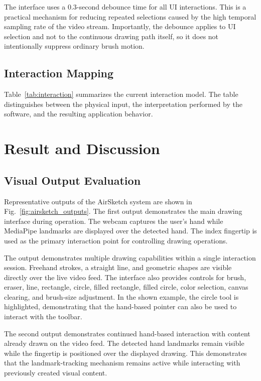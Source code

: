 \documentclass[conference]{IEEEtran}
\begin{document}
The interface uses a 0.3-second debounce time for all UI interactions. This is a practical mechanism for reducing repeated selections caused by the high temporal sampling rate of the video stream. Importantly, the debounce applies to UI selection and not to the continuous drawing path itself, so it does not intentionally suppress ordinary brush motion.

\subsection{Interaction Mapping}
Table~\ref{tab:interaction} summarizes the current interaction model. The table distinguishes between the physical input, the interpretation performed by the software, and the resulting application behavior.

\section{Result and Discussion}

\subsection{Visual Output Evaluation}

Representative outputs of the AirSketch system are shown in Fig.~\ref{fig:airsketch_outputs}. The first output demonstrates the main drawing interface during operation. The webcam captures the user's hand while MediaPipe landmarks are displayed over the detected hand. The index fingertip is used as the primary interaction point for controlling drawing operations.

The output demonstrates multiple drawing capabilities within a single interaction session. Freehand strokes, a straight line, and geometric shapes are visible directly over the live video feed. The interface also provides controls for brush, eraser, line, rectangle, circle, filled rectangle, filled circle, color selection, canvas clearing, and brush-size adjustment. In the shown example, the circle tool is highlighted, demonstrating that the hand-based pointer can also be used to interact with the toolbar.

The second output demonstrates continued hand-based interaction with content already drawn on the video feed. The detected hand landmarks remain visible while the fingertip is positioned over the displayed drawing. This demonstrates that the landmark-tracking mechanism remains active while interacting with previously created visual content.
\end{document}
